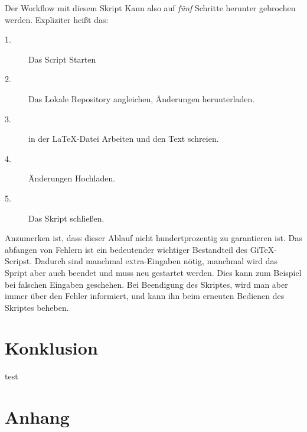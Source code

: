 \documentclass[12pt,a4paper]{scrartcl}
\begin{document}
Der Workflow mit diesem Skript Kann also auf \emph{fünf} Schritte herunter gebrochen werden. Expliziter heißt das:
\begin{description}
\item[1.] Das Script Starten
\item[2.] Das Lokale Repository angleichen, Änderungen herunterladen.
\item[3.] in der \LaTeX -Datei Arbeiten und den Text schreien.
\item[4.] Änderungen Hochladen.
\item[5.] Das Skript schließen.
\end{description}

Anzumerken ist, dass dieser Ablauf nicht hundertprozentig zu garantieren ist. Das abfangen von Fehlern ist ein bedeutender wichtiger Bestandteil des GiTeX-Scripst. Dadurch sind manchmal extra-Eingaben nötig, manchmal wird das Spript aber auch beendet und muss neu gestartet werden. Dies kann zum Beispiel bei falschen Eingaben geschehen. Bei Beendigung des Skriptes, wird man aber immer über den Fehler informiert, und kann ihn beim erneuten Bedienen des Skriptes beheben.

\section{Konklusion}

test

\section{Anhang}
\end{document}
